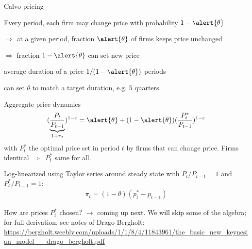 \documentclass{beamer}
\newenvironment{mytemize}
{\vfill\itemize[nolistsep,itemsep=\fill,label=\color{blue}{$\triangleright$}]}
  {\enditemize}
\newcommand{\rarr}{$\Rightarrow$\ }
\begin{document}
\begin{frame}{Calvo pricing}

\begin{mytemize}
\item Every period, each firm may change price with probability $1-\alert{\theta}$
\item[$\Rightarrow$] at a given period, fraction $\alert{\theta}$ of firms keeps price unchanged
\item[$\Rightarrow$] fraction $1-\alert{\theta}$ can set new price
\item average duration of a price $1/(1-\alert{\theta})$ periods 
  \begin{mytemize}
  \item can set $\theta$ to match a target duration, e.g. 5 quarters	
  \end{mytemize}
\end{mytemize}


\end{frame}
\begin{frame}{Aggregate price dynamics}
\begin{align}
  (\underbrace{\frac{P_t}{P_{t-1}}}_{1+\pi_t} )^{1-\varepsilon} = \alert{\theta} + (1-\alert{\theta}) ( \frac{P_t^*}{P_{t-1}} )^{1-\varepsilon} \nonumber%
\end{align}
with $P^*_t$ the optimal price set in period $t$ by firms that can change price. Firms identical \rarr $P^*_t$ same for all.

\medskip
Log-linearized using Taylor series around steady state with $P_t/P_{t-1}=1$  and $P_t^*/P_{t-1}=1$:
\begin{align}
  \pi_t = (1-\theta) (p^*_t-p_{t-1}) \label{aggprice_log}
\end{align}

\begin{mytemize}
\small
\item How are prices $P^*_t$ chosen? $\rightarrow$ coming up next. We will skip some of the algebra; for full derivation, see notes of Drago Bergholt: 
\vfill
  \url{https://bergholt.weebly.com/uploads/1/1/8/4/11843961/the_basic_new_keynesian_model_-_drago_bergholt.pdf}
\end{mytemize}
\end{frame}
\end{document}
